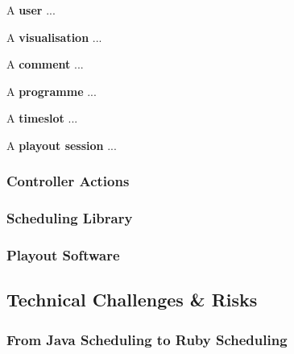 \documentclass[a4paper, titlepage]{article}
\begin{document}

A \textbf{user} ...

A \textbf{visualisation} ...

A \textbf{comment} ...

A \textbf{programme} ...

A \textbf{timeslot} ...

A \textbf{playout session} ...


\subsubsection{Controller Actions}




\subsubsection{Scheduling Library}


\subsubsection{Playout Software}




\subsection{Technical Challenges \& Risks}


\subsubsection{From Java Scheduling to Ruby Scheduling}
\end{document}
